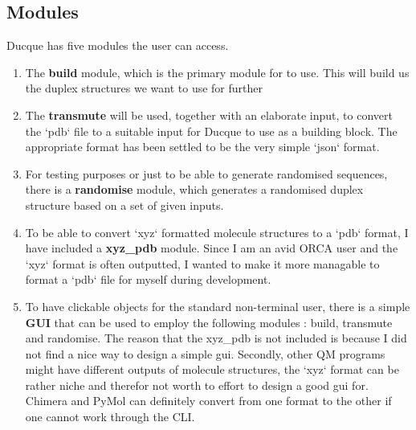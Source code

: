 \subsection{Modules}
Ducque has five modules the user can access.
\begin{enumerate}
    \item The \textbf{build} module, which is the primary module for to use. This will build us the duplex structures
we want to use for further
\item The \textbf{transmute} will be used, together with an elaborate input, to convert the ‘pdb‘ file to a
suitable input for Ducque to use as a building block. The appropriate format has been settled to
be the very simple ‘json‘ format.
\item For testing purposes or just to be able to generate randomised sequences, there is a \textbf{randomise}
module, which generates a randomised duplex structure based on a set of given inputs.
    \item To be able to convert ‘xyz‘ formatted molecule structures to a ‘pdb‘ format, I have included a
        \textbf{xyz\_pdb} module. Since I am an avid ORCA user and the ‘xyz‘ format is often outputted, I
wanted to make it more managable to format a ‘pdb‘ file for myself during development.
\item To have clickable objects for the standard non-terminal user, there is a simple \textbf{GUI} that can be
used to employ the following modules : build, transmute and randomise. The reason that the
xyz\_pdb is not included is because I did not find a nice way to design a simple gui. Secondly,
other QM programs might have different outputs of molecule structures, the ‘xyz‘ format can be
rather niche and therefor not worth to effort to design a good gui for. Chimera and PyMol can
definitely convert from one format to the other if one cannot work through the CLI.
    
\end{enumerate}
